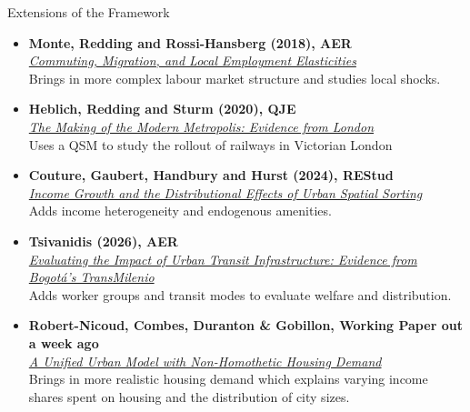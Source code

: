 \documentclass[aspectratio=169,11pt]{beamer}
\begin{document}
\begin{frame}{Extensions of the Framework}
  \small
  \begin{itemize}
    \setlength{\itemsep}{0.55em}
    \item \textbf{Monte, Redding and Rossi-Hansberg (2018), AER}\\
      \href{https://doi.org/10.1257/aer.20151507}{\emph{Commuting, Migration, and Local Employment Elasticities}}\\
      Brings in more complex labour market structure and studies local shocks.
    \item \textbf{Heblich, Redding and Sturm (2020), QJE}\\
      \href{https://doi.org/10.1093/qje/qjaa014}{\emph{The Making of the Modern Metropolis: Evidence from London}}\\
      Uses a QSM to study the rollout of railways in Victorian London
    \item \textbf{Couture, Gaubert, Handbury and Hurst (2024), REStud}\\
      \href{https://doi.org/10.1093/restud/rdad048}{\emph{Income Growth and the Distributional Effects of Urban Spatial Sorting}}\\
      Adds income heterogeneity and endogenous amenities.
    \item \textbf{Tsivanidis (2026), AER}\\
      \href{https://doi.org/10.1257/aer.20190874}{\emph{Evaluating the Impact of Urban Transit Infrastructure:
      Evidence from Bogot\'a's TransMilenio}}\\
      Adds worker groups and transit modes to evaluate welfare and distribution.
    \item \textbf{Robert-Nicoud, Combes, Duranton \& Gobillon, Working Paper out a week ago }\\
      \href{https://www.dropbox.com/scl/fi/q68a2vee7pke53zjl3f27/PIGLUM_live.pdf?rlkey=727pufl3n91drp7rbdqnk5p6p&e=1&dl=0}{\emph{A Unified Urban Model with Non-Homothetic Housing Demand}}\\
      Brings in more realistic housing demand which explains varying income shares spent on housing and the distribution of city sizes. 
  \end{itemize}
\end{frame}
\end{document}
